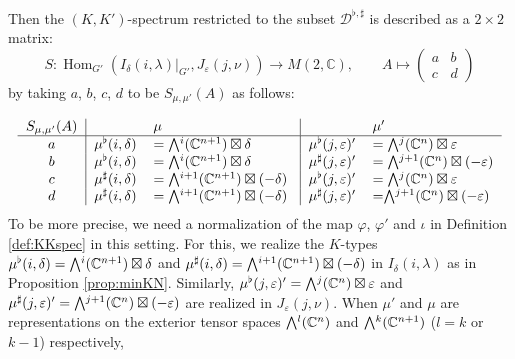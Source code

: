 Then the $(K,K')$-spectrum restricted
 to the subset ${\mathcal{D}}^{\flat,\sharp}$
 is described as a $2 \times 2$ matrix: 
\begin{equation}
\label{eqn:Smat}
S:\operatorname{Hom}_{G'}(I_{\delta}(i,\lambda)|_{G'},J_{\varepsilon}(j,\nu))
  \to 
  M(2,{\mathbb{C}}),
  \qquad
  A 
  \mapsto
  \begin{pmatrix} a & b \\ c & d \end{pmatrix}
\end{equation}
 by taking $a$, $b$, $c$, $d$
 to be $S_{\mu,\mu'}(A)$ as follows:

\begin{equation*}
\begin{tabular}{c|rl|rl}
{$S_{\mu,\mu'}(A)$}
&
&{$\mu$}
&
&{$\mu'$}
\\
\hline
  $a$ 
& $\mub(i,\delta)$
& $=\Exterior^i({\mathbb{C}}^{n+1}) \boxtimes \delta$ 
& $\mub(j,\varepsilon)'$
& $=\Exterior^j({\mathbb{C}}^{n}) \boxtimes \varepsilon$
\\%
$b$ 
& $\mub(i,\delta)$
& $=\Exterior^i({\mathbb{C}}^{n+1}) \boxtimes \delta$ 
& $\mus(j,\varepsilon)'$
& $=\Exterior^{j+1}({\mathbb{C}}^{n}) \boxtimes (-\varepsilon)$
\\%
$c$ 
& $\mus(i,\delta)$
& $=\Exterior^{i+1}({\mathbb{C}}^{n+1}) \boxtimes (-\delta)$
& $\mub(j,\varepsilon)'$
&$=\Exterior^{j}({\mathbb{C}}^{n}) \boxtimes \varepsilon$
\\%
$d$ 
& $\mus(i,\delta)$
& $=\Exterior^{i+1}({\mathbb{C}}^{n+1}) \boxtimes (-\delta)$
\qquad
& $\mus(j,\varepsilon)'$
&=$\Exterior^{j+1}({\mathbb{C}}^{n}) \boxtimes (-\varepsilon)$
\end{tabular}
\end{equation*}
To be more precise,
 we need a normalization
of the map $\varphi$, $\varphi'$
 and $\iota$
 in Definition \ref{def:KKspec} in this setting.  
For this,
 we realize the $K$-types
 $\mub(i,\delta)=\Exterior^i({\mathbb{C}}^{n+1}) \boxtimes \delta$
 and $\mus(i,\delta)=\Exterior^{i+1}({\mathbb{C}}^{n+1}) \boxtimes (-\delta)$
 in $I_{\delta}(i,\lambda)$
 as in Proposition \ref{prop:minKN}.  
Similarly,
 $\mub(j,\varepsilon)'=\Exterior^j({\mathbb{C}}^{n}) \boxtimes \varepsilon$
 and 
 $\mus(j,\varepsilon)'=\Exterior^{j+1}({\mathbb{C}}^{n}) \boxtimes (-\varepsilon)$ 
 are realized in $J_{\varepsilon}(j,\nu)$.  
When $\mu'$ and $\mu$ are representations
 on the exterior tensor spaces $\Exterior^l({\mathbb{C}}^{n})$
 and $\Exterior^k({\mathbb{C}}^{n+1})$
 ($l=k$ or $k-1$) respectively,
